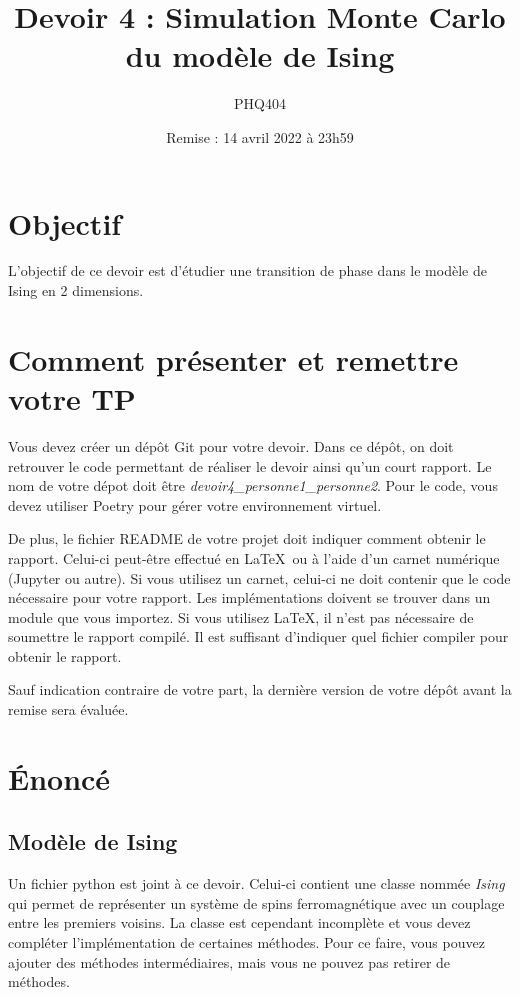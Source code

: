 \documentclass{article}
\begin{document}
\title{Devoir 4 : Simulation Monte Carlo du modèle de Ising}
\author{PHQ404}
\date{Remise : 14 avril 2022 à 23h59}
\maketitle

\section{Objectif}

L'objectif de ce devoir est d'étudier une transition de phase
dans le modèle de Ising en 2 dimensions.

\section{Comment présenter et remettre votre TP}

Vous devez créer un dépôt Git pour votre devoir.
Dans ce dépôt, on doit retrouver le code permettant de réaliser le devoir 
ainsi qu'un court rapport. 
Le nom de votre dépot doit être \textit{devoir4\_personne1\_personne2}.
Pour le code, vous devez utiliser Poetry pour gérer votre environnement virtuel.

De plus, le fichier README de votre projet doit indiquer comment obtenir le rapport.
Celui-ci peut-être effectué en \LaTeX\ ou à l'aide d'un carnet numérique (Jupyter ou autre).
Si vous utilisez un carnet, celui-ci ne doit contenir que le code nécessaire pour votre rapport.
Les implémentations doivent se trouver dans un module que vous importez.
Si vous utilisez \LaTeX, il n'est pas nécessaire de soumettre le rapport compilé.
Il est suffisant d'indiquer quel fichier compiler pour obtenir le rapport.

Sauf indication contraire de votre part, 
la dernière version de votre dépôt avant la remise sera évaluée.

\section{Énoncé}

\subsection{Modèle de Ising}

Un fichier python est joint à ce devoir. 
Celui-ci contient une classe nommée \textit{Ising} qui permet de représenter 
un système de spins ferromagnétique avec un couplage entre les premiers voisins.
La classe est cependant incomplète et vous devez compléter l'implémentation 
de certaines méthodes. 
Pour ce faire, vous pouvez ajouter des méthodes intermédiaires, 
mais vous ne pouvez pas retirer de méthodes.
\end{document}
